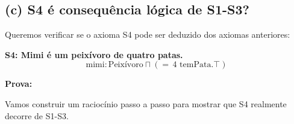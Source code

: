 \documentclass{article}
\begin{document}
\newpage

\subsection*{(c) S4 é consequência lógica de S1-S3?}

Queremos verificar se o axioma S4 pode ser deduzido dos axiomas anteriores:

\vspace{1em}

\noindent\textbf{S4: Mimi é um peixívoro de quatro patas.}
\[
    \text{mimi} : \text{Peixívoro} \sqcap ({=}\,4\text{ temPata}.\top)
\]

\vspace{1em}

\noindent\textbf{Prova:}

\vspace{0.5em}

Vamos construir um raciocínio passo a passo para mostrar que S4 realmente decorre de S1-S3.
\end{document}
